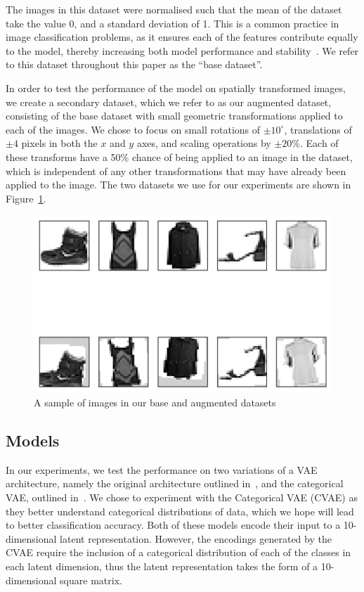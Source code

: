 \documentclass[twocolumn]{article}
\begin{document}
The images in this dataset were normalised such that the mean of the dataset take the value 0, and a standard deviation of 1. This is a common practice in image classification problems, as it ensures each of the features contribute equally to the model, thereby increasing both model performance and stability~\cite{singh2020investigation}. We refer to this dataset throughout this paper as the ``base dataset''. 

In order to test the performance of the model on spatially transformed images, we create a secondary dataset, which we refer to as our augmented dataset, consisting of the base dataset with small geometric transformations applied to each of the images. We chose to focus on small rotations of \(\pm10^\circ\), translations of \(\pm4\) pixels in both the \(x\) and \(y\) axes, and scaling operations by \(\pm20\)\%. Each of these transforms have a 50\% chance of being applied to an image in the dataset, which is independent of any other transformations that may have already been applied to the image. The two datasets we use for our experiments are shown in Figure~\ref{fig:aug}.

\begin{figure}
    \centering
    \includegraphics[scale=0.5]{../images/augment.png}
    \caption{A sample of images in our base and augmented datasets}
    \label{fig:aug}
\end{figure}

\subsection{Models}

In our experiments, we test the performance on two variations of a VAE architecture, namely the original architecture outlined in~\cite{kingma2022autoencodingvariationalbayes}, and the categorical VAE, outlined in~\cite{jang2017categoricalreparameterizationgumbelsoftmax}. We chose to experiment with the Categorical VAE (CVAE) as they better understand categorical distributions of data, which we hope will lead to better classification accuracy. Both of these models encode their input to a 10-dimensional latent representation. However, the encodings generated by the CVAE require the inclusion of a categorical distribution of each of the classes in each latent dimension, thus the latent representation takes the form of a 10-dimensional square matrix. 
\end{document}
